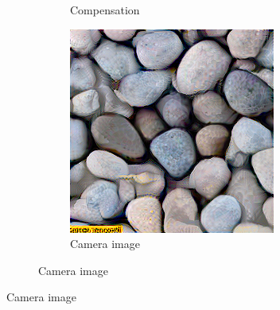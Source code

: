 \begin{figure}[]
\begin{subfigure}{\textwidth}
\begin{subfigure}{0.24\textwidth}
            \caption{Compensation}
            \label{fig:ex01-pebbles-1000steps-some_im}
        \end{subfigure}
        \hfill
        \begin{subfigure}{0.24\textwidth}
            \centering
            \includegraphics[width=\textwidth]{images/04-experiment01/pebbles/1000/some_proj.jpg}
            \caption{Camera image}
            \label{fig:ex01-pebbles-1000steps-some_proj}
        \end{subfigure}
        

\end{subfigure}
\end{figure}
